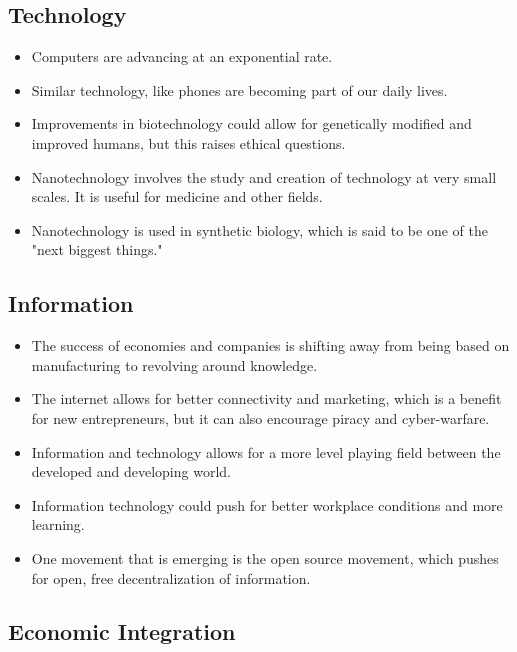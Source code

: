 \documentclass[11pt]{article}
\begin{document}
\subsection{Technology}
\label{sec:org8463049}

\begin{itemize}
\item Computers are advancing at an exponential rate.
\item Similar technology, like phones are becoming part of our daily lives.
\item Improvements in biotechnology could allow for genetically modified and improved humans, but this raises ethical questions.
\item Nanotechnology involves the study and creation of technology at very small scales. It is useful for medicine and other fields.
\item Nanotechnology is used in synthetic biology, which is said to be one of the "next biggest things."
\end{itemize}
\subsection{Information}
\label{sec:org781c7e0}

\begin{itemize}
\item The success of economies and companies is shifting away from being based on manufacturing to revolving around knowledge.
\item The internet allows for better connectivity and marketing, which is a benefit for new entrepreneurs, but it can also encourage piracy and cyber-warfare.
\item Information and technology allows for a more level playing field between the developed and developing world.
\item Information technology could push for better workplace conditions and more learning.
\item One movement that is emerging is the open source movement, which pushes for open, free decentralization of information.
\end{itemize}
\subsection{Economic Integration}
\label{sec:orge12564f}
\end{document}
